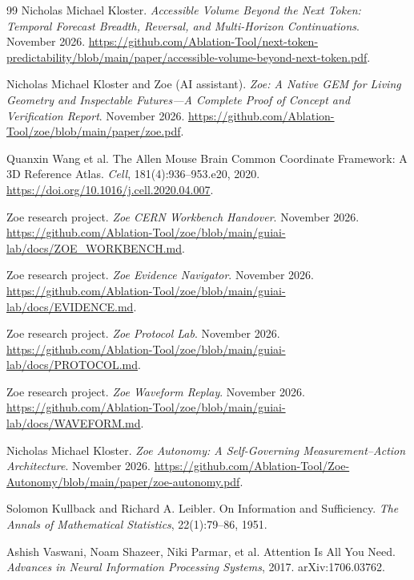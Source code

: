 \begin{thebibliography}{99}
Nicholas Michael Kloster.
\newblock \emph{Accessible Volume Beyond the Next Token: Temporal Forecast Breadth, Reversal, and Multi-Horizon Continuations}.
\newblock November 2026.
\newblock \url{https://github.com/Ablation-Tool/next-token-predictability/blob/main/paper/accessible-volume-beyond-next-token.pdf}.

Nicholas Michael Kloster and Zoe (AI assistant).
\newblock \emph{Zoe: A Native GEM for Living Geometry and Inspectable Futures---A Complete Proof of Concept and Verification Report}.
\newblock November 2026.
\newblock \url{https://github.com/Ablation-Tool/zoe/blob/main/paper/zoe.pdf}.

Quanxin Wang et al.
\newblock The Allen Mouse Brain Common Coordinate Framework: A 3D Reference Atlas.
\newblock \emph{Cell}, 181(4):936--953.e20, 2020.
\newblock \url{https://doi.org/10.1016/j.cell.2020.04.007}.

Zoe research project.
\newblock \emph{Zoe CERN Workbench Handover}.
\newblock November 2026.
\newblock \url{https://github.com/Ablation-Tool/zoe/blob/main/guiai-lab/docs/ZOE_WORKBENCH.md}.

Zoe research project.
\newblock \emph{Zoe Evidence Navigator}.
\newblock November 2026.
\newblock \url{https://github.com/Ablation-Tool/zoe/blob/main/guiai-lab/docs/EVIDENCE.md}.

Zoe research project.
\newblock \emph{Zoe Protocol Lab}.
\newblock November 2026.
\newblock \url{https://github.com/Ablation-Tool/zoe/blob/main/guiai-lab/docs/PROTOCOL.md}.

Zoe research project.
\newblock \emph{Zoe Waveform Replay}.
\newblock November 2026.
\newblock \url{https://github.com/Ablation-Tool/zoe/blob/main/guiai-lab/docs/WAVEFORM.md}.

Nicholas Michael Kloster.
\newblock \emph{Zoe Autonomy: A Self-Governing Measurement--Action Architecture}.
\newblock November 2026.
\newblock \url{https://github.com/Ablation-Tool/Zoe-Autonomy/blob/main/paper/zoe-autonomy.pdf}.

Solomon Kullback and Richard A. Leibler.
\newblock On Information and Sufficiency.
\newblock \emph{The Annals of Mathematical Statistics}, 22(1):79--86, 1951.

Ashish Vaswani, Noam Shazeer, Niki Parmar, et al.
\newblock Attention Is All You Need.
\newblock \emph{Advances in Neural Information Processing Systems}, 2017.
\newblock arXiv:1706.03762.


\end{thebibliography}
